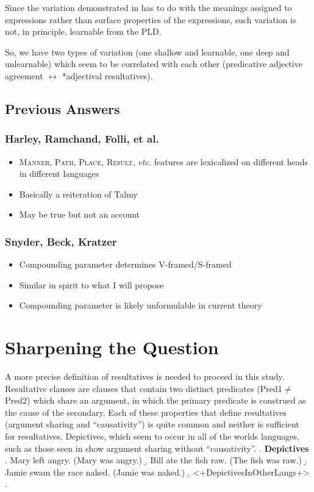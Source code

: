 \documentclass[letterpaper,12pt]{article}
\begin{document}
Since the variation demonstrated in \Last has to do with the meanings assigned to expressions rather than surface properties of the expressions, such variation is not, in principle, learnable from the PLD.

So, we have two types of variation (one shallow and learnable, one deep and unlearnable) which seem to be correlated with each other (predicative adjective agreement $\leftrightarrow$ *adjectival resultatives).
\subsection{Previous Answers}
\subsubsection{Harley, Ramchand, Folli, et al.}
\begin{itemize}
  \item \textsc{Manner, Path, Place, Result}, \textit{etc.} features are lexicalized on different heads in different languages
  \item Basically a reiteration of Talmy
  \item May be true but not an account
\end{itemize}
\subsubsection{Snyder, Beck, Kratzer}
\begin{itemize}
  \item Compounding parameter determines V-framed/S-framed
  \item Similar in spirit to what I will propose
  \item Compounding parameter is likely unformulable in current theory
\end{itemize}

\section{Sharpening the Question}
A more precise definition of resultatives is needed to proceed in this study.
Resultative clauses are clauses that contain two distinct predicates (Pred1$\neq$Pred2) which share an argument, in which the primary predicate is construed as the cause of the secondary.
Each of these properties that define resultatives (argument sharing and ``causativity'') is quite common and neither is sufficient for resultatives.
Depictives, which seem to occur in all of the worlds languages, such as those seen in \Next show argument sharing without ``causativity''.
\ex. \textbf{Depictives}
\a. Mary left angry. (Mary was angry.)
\b. Bill ate the fish raw. (The fish was raw.)
\b. Jamie swam the race naked. (Jamie was naked.)
\b. <+DepictivesInOtherLangs+>
\z.
\end{document}
